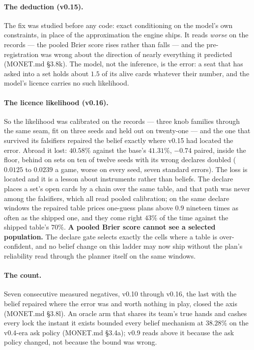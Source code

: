 \documentclass[11pt]{article}
\newcommand{\monet}{MONET.md}
\begin{document}
\paragraph{The deduction (v0.15).} The fix was studied before any code: exact conditioning on the
model's own constraints, in place of the approximation the engine ships. It reads \emph{worse} on the
records --- the pooled Brier score rises rather than falls --- and the pre-registration was wrong
about the direction of nearly everything it predicted (\monet{} \S3.8k). The model, not the
inference, is the error: a seat that has asked into a set holds about $1.5$ of its alive cards
whatever their number, and the model's licence carries no such likelihood.

\paragraph{The licence likelihood (v0.16).} So the likelihood was calibrated on the records --- three
knob families through the same seam, fit on three seeds and held out on twenty-one --- and the one
that survived its falsifiers repaired the belief exactly where v0.15 had located the error. Abroad it
lost: $40.58\%$ against the base's $41.31\%$, $-0.74$ paired, inside the floor, behind on sets on
ten of twelve seeds with its wrong declares doubled ($0.0125$ to $0.0239$ a game, worse on every
seed, seven standard errors). The loss is located and it is a lesson about instruments rather than
beliefs. The declare places a set's open cards by a chain over the same table, and that path was
never among the falsifiers, which all read pooled calibration; on the same declare windows the
repaired table prices one-guess plans above $0.9$ nineteen times as often as the shipped one, and
they come right $43\%$ of the time against the shipped table's $70\%$. \textbf{A pooled Brier score
cannot see a selected population.} The declare gate selects exactly the cells where a table is
over-confident, and no belief change on this ladder may now ship without the plan's reliability
read through the planner itself on the same windows.

\paragraph{The count.} Seven consecutive measured negatives, v0.10 through v0.16, the last with the
belief repaired where the error was and worth nothing in play, closed the axis (\monet{} \S3.8l). An
oracle arm that shares its team's true hands and cashes every lock the instant it exists bounded
every belief mechanism at $38.28\%$ on the v0.4-era ask policy (\monet{} \S3.4a); v0.9 reads above
it because the ask policy changed, not because the bound was wrong.
\end{document}
